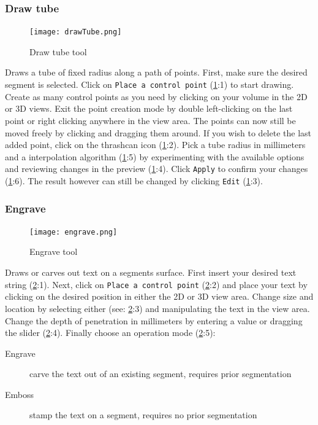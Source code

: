 \subsubsection{Draw tube}\label{section:dt}
\begin{figure}[h!]
	\centerline{
		\texttt{[image: drawTube.png]}}
	\caption{Draw tube tool}\label{fig:tube}
\end{figure}
\noindent
Draws a tube of fixed radius along a path of points.
First, make sure the desired segment is selected.
Click on \texttt{Place a control point} (\cref{fig:tube}:1) to start drawing.
Create as many control points as you need by clicking on your volume in the 2D or 3D views.
Exit the point creation mode by double left-clicking on the last point or right clicking anywhere in the view area.
The points can now still be moved freely by clicking and dragging them around.
If you wish to delete the last added point, click on the thrashcan icon (\cref{fig:tube}:2).
Pick a tube radius in millimeters and a interpolation algorithm (\cref{fig:tube}:5) by experimenting with the available options and reviewing changes in the preview (\cref{fig:tube}:4).
Click \texttt{Apply} to confirm your changes (\cref{fig:tube}:6).
The result however can still be changed by clicking \texttt{Edit} (\cref{fig:tube}:3).

\pagebreak
\subsubsection{Engrave}
\begin{figure}[h!]
	\centerline{
		\texttt{[image: engrave.png]}}
	\caption{Engrave tool}\label{fig:eng}
\end{figure}
\noindent
Draws or carves out text on a segments surface.
First insert your desired text string (\cref{fig:eng}:1).
Next, click on \texttt{Place a control point} (\cref{fig:eng}:2) and place your text by clicking on the desired position in either the 2D or 3D view area.
Change size and location by selecting either (see: \cref{fig:eng}:3) and manipulating the text in the view area.
Change the depth of penetration in millimeters by entering a value or dragging the slider (\cref{fig:eng}:4).
Finally choose an operation mode (\cref{fig:eng}:5):
\begin{description}
	\item [Engrave] carve the text out of an existing segment, requires prior segmentation
	\item [Emboss] stamp the text on a segment, requires no prior segmentation
\end{description}


